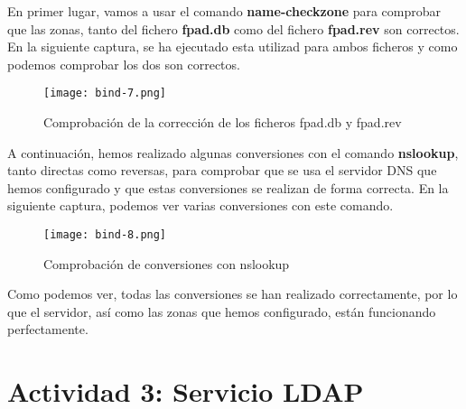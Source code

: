 En primer lugar, vamos a usar el comando \textbf{name-checkzone} para comprobar que las zonas, tanto del fichero \textbf{fpad.db} como del fichero \textbf{fpad.rev} son correctos. En la siguiente captura, se ha ejecutado esta utilizad para ambos ficheros y como podemos comprobar los dos son correctos.

\begin{figure}[H]
    \centering
    \texttt{[image: bind-7.png]}
    \caption{Comprobación de la corrección de los ficheros fpad.db y fpad.rev}
\end{figure}

A continuación, hemos realizado algunas conversiones con el comando \textbf{nslookup}, tanto directas como reversas, para comprobar que se usa el servidor DNS que hemos configurado y que estas conversiones se realizan de forma correcta. En la siguiente captura, podemos ver varias conversiones con este comando.

\begin{figure}[H]
    \centering
    \texttt{[image: bind-8.png]}
    \caption{Comprobación de conversiones con nslookup}
\end{figure}

Como podemos ver, todas las conversiones se han realizado correctamente, por lo que el servidor, así como las zonas que hemos configurado, están funcionando perfectamente.

\section{Actividad 3: Servicio LDAP}
